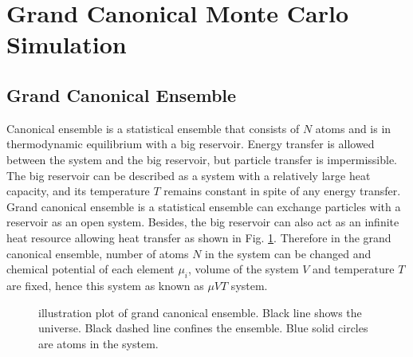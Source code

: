 \section{Grand Canonical Monte Carlo Simulation}
\label{Chap:Mech:GCMC}

\subsection{Grand Canonical Ensemble}

Canonical ensemble is a statistical ensemble that consists of $N$ atoms and is in thermodynamic equilibrium with a big reservoir. Energy transfer is allowed between the system and the big reservoir, but particle transfer is impermissible. The big reservoir can be described as a system with a relatively large heat capacity, and its temperature $T$ remains constant in spite of any energy transfer. Grand canonical ensemble is a statistical ensemble can exchange particles with a reservoir as an open system. Besides, the big reservoir can also act as an infinite heat resource allowing heat transfer as shown in Fig. \ref{Chap:Meth:GCMC:fig1}. \cite{frenkel2001understanding} Therefore in the grand canonical ensemble, number of atoms $N$ in the system can be changed and chemical potential of each element $\mu_i$, volume of the system $V$ and temperature $T$ are fixed, hence this system as known as $\mu VT$ system.

\begingroup
\begin{figure}[!ht]
  \centering
  \caption[Illustration plot of grand canonical ensemble]{illustration plot of grand canonical ensemble. Black line shows the universe. Black dashed line confines the ensemble. Blue solid circles are atoms in the system.}
  \label{Chap:Meth:GCMC:fig1}
\end{figure}
\endgroup

